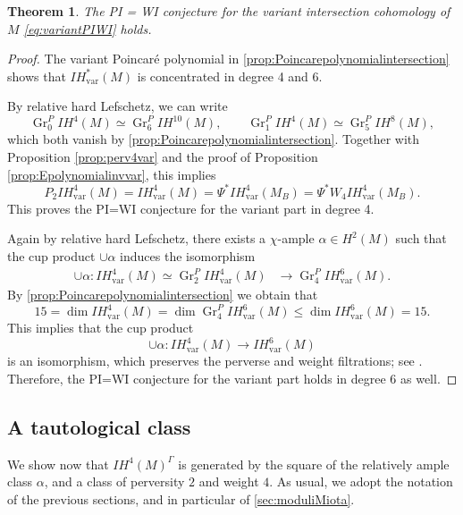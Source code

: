 \documentclass[JEP,XML,SOM,Unicode, NoEqCountersInSection,NoFloatCountersInSection,published]{cedram}
\newcommand{\IH}{\mathit{IH}}
\newtheorem{thm}{Theorem}[section]
\theoremstyle{definition}
\newcommand{\Gr}{\operatorname{Gr}}
\begin{document}
\begin{thm}\label{PI=WIvariant}
The PI = WI conjecture for the variant intersection cohomology of~$M$ \eqref{eq:variantPIWI} holds.
\end{thm}
\begin{proof}
The variant Poincaré polynomial in \cref{prop:Poincarepolynomialintersection} shows that $\IH^*_{\mathrm{var}}(M)$ is concentrated in degree 4 and 6.

By relative hard Lefschetz, we can write\vspace*{-3pt}
\[
\Gr^P_0 \IH^4(M)\simeq \Gr^P_{6} \IH^{10}(M), \qquad
\Gr^P_1 \IH^4(M)\simeq \Gr^P_{5} \IH^{8}(M),
\]
which both vanish by \cref{prop:Poincarepolynomialintersection}. Together with Proposition \ref{prop:perv4var} and the proof of Proposition \ref{prop:Epolynomialinvvar}, this implies\vspace*{-3pt}
\[
P_2 \IH_{\mathrm{var}}^4(M) = \IH_{\mathrm{var}}^4(M) = \Psi^* \IH_{\mathrm{var}}^4(M_B) = \Psi^*W_4 \IH_{\mathrm{var}}^4(M_B).
\]
This proves the PI=WI conjecture for the variant part in degree 4.

Again by relative hard Lefschetz, there exists a $\chi$-ample $\alpha \in H^{2}(M)$ such that the cup product $\cup \alpha$
induces the isomorphism
\begin{align*}
\cup \alpha\colon \IH_{\mathrm{var}}^4(M) \simeq \Gr^P_2 \IH_{\mathrm{var}}^4(M) & \to \Gr^P_4 \IH^6_{\mathrm{var}}(M).
\end{align*}
By \cref{prop:Poincarepolynomialintersection} we obtain that
\[
15 = \dim \IH_{\mathrm{var}}^4(M) = \dim \Gr^P_4 \IH^6_{\mathrm{var}}(M) \leq \dim \IH_{\mathrm{var}}^6(M)=15.
\]
This implies that the cup product
\[
\cup \alpha\colon \IH^4_{\mathrm{var}}(M) \to \IH^6_{\mathrm{var}}(M)
\]
is an isomorphism, which preserves the perverse and weight filtrations; see \cite[Lem.\,1.4.4]{deCataldoHauselMigliorini2012}. Therefore, the PI=WI conjecture for the variant part holds in degree $6$ as well.
\end{proof}

\subsection{A tautological class}\label{sec:a tautological class}
We show now that $\IH^4(M)^{\Gamma}$ is generated by the square of the relatively ample class $\alpha$, and a class of perversity $2$ and weight $4$. As usual, we adopt the notation of the previous sections, and in particular of \cref{sec:moduliMiota}.
\end{document}
